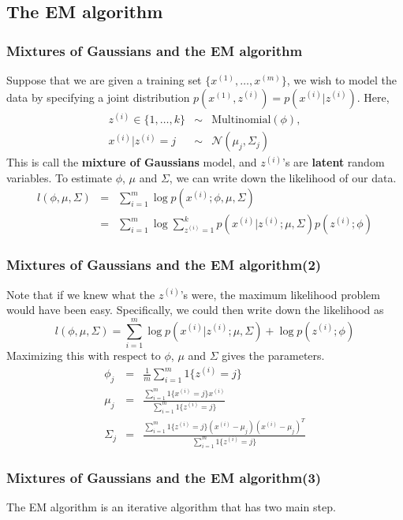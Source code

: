 \documentclass[slidestop,compress,mathserif]{beamer}
\begin{document}
	\subsection{The EM algorithm}
	\begin{frame}
		\frametitle{Mixtures of Gaussians and the EM algorithm}
		Suppose that we are given a training set $\{x^{(1)},
		\ldots,x^{(m)}\}$, we wish to model the data by specifying
		a joint distribution $p(x^{(1)},z^{(i)})=p(x^{(i)}|z^{(i)})$.
		Here, 
		\begin{eqnarray*}
			z^{(i)}\in\{1,\ldots,k\}&\sim&\mathrm{Multinomial}(\phi),\\
			x^{(i)}|z^{(i)}=j&\sim&\mathcal{N}(\mu_j,\Sigma_j)
		\end{eqnarray*}
		This is call the \textbf{mixture of Gaussians} model, and
		$z^{(i)}$'s are \textbf{latent} random variables.
		To estimate $\phi$, $\mu$ and $\Sigma$, we can write down
		the likelihood of our data.
		\begin{eqnarray*}
			l(\phi,\mu,\Sigma) &=& \sum_{i=1}^m\log p(x^{(i)};
			\phi,\mu,\Sigma)\\
			&=& \sum_{i=1}^m\log\sum_{z^{(i)}=1}^kp(x^{(i)}|z^{(i)};
			\mu,\Sigma)p(z^{(i)};\phi) 
		\end{eqnarray*}		 
		
	\end{frame}
	\begin{frame}[shrink]
		\frametitle{Mixtures of Gaussians and the EM algorithm(2)}
		Note that if we knew what the $z^{(i)}$'s were, the maximum
		likelihood problem would have been easy. Specifically, we
		could then write down the likelihood as
		$$l(\phi,\mu,\Sigma)=\sum_{i=1}^m\log p(x^{(i)}|z^{(i)};\mu,
		\Sigma)+\log p(z^{(i)};\phi)$$
		Maximizing this with respect to $\phi$, $\mu$ and $\Sigma$ 
		gives the parameters.
		\begin{eqnarray*}
			\phi_j &=& \frac{1}{m}\sum_{i=1}^m1\{z^{(i)}=j\}\\
			\mu_j &=& \frac{\sum_{i=1}^m1\{x^{(i)}=j\}x^{(i)}}{
			\sum_{i=1}^m1\{z^{(i)}=j\}}\\
			\Sigma_j &=& \frac{\sum_{i=1}^m1\{z^{(i)}=j\}(x^{(i)}-
			\mu_j)(x^{(i)}-\mu_j)^T}{\sum_{i=1}^m1\{z^{(i)}=j\}}
		\end{eqnarray*}
	\end{frame}	
	\begin{frame}
		\frametitle{Mixtures of Gaussians and the EM algorithm(3)}
		The EM algorithm is an iterative algorithm that has two main
		step.
		\begin{figure}
        \end{figure}
	\end{frame}	
\end{document}
